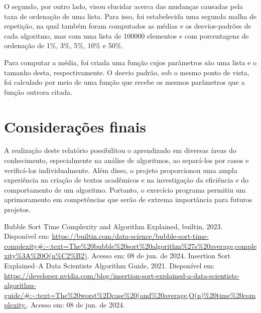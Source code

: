 \documentclass[10pt,a4paper]{article}
\begin{document}
    O segundo, por outro lado, visou elucidar acerca das mudanças causadas pela taxa de ordenação de uma lista.
    Para isso, foi estabelecida uma segunda malha de repetição, na qual também foram computados as médias e os desvios-padrões de cada algoritmo, mas com uma lista de 100000 elementos e com porcentagens de ordenação de 1\%, 3\%, 5\%, 10\% e 50\%.
    

    Para computar a média, foi criada uma função cujos parâmetros são uma lista e o tamanho desta, respectivamente. O desvio padrão, sob o mesmo ponto de vista, foi calculado por meio de uma função que recebe os mesmos parâmetros que a função outrora citada.
    


\newpage
\tableofcontents










\section{Considerações finais}
A realização deste relatório possibilitou o aprendizado em diversas áreas do conhecimento, especialmente na análise de algoritmos, ao separá-los por casos e verificá-los individualmente.
Além disso, o projeto proporcionou uma ampla experiência na criação de textos acadêmicos e na investigação da eficiência e do comportamento de um algoritmo.
Portanto, o exercício programa permitiu um aprimoramento em competências que serão de extrema importância para futuros projetos.

\newpage
\begin{thebibliography}{3}
    Bubble Sort Time Complexity and Algorithm Explained, builtin, 2023. Disponível em: \url{https://builtin.com/data-science/bubble-sort-time-complexity#:~:text=The%20bubble%20sort%20algorithm%27s%20average,complexity%3A%20O(n%C2%B2)}. Acesso em: 08 de jun. de 2024.
    Insertion Sort Explained–A Data Scientists Algorithm Guide, 2021. Disponível em: \url{https://developer.nvidia.com/blog/insertion-sort-explained-a-data-scientists-algorithm-guide/#:~:text=The%20worst%2Dcase%20(and%20average,O(n)%20time%20complexity.}. Acesso em: 08 de jun. de 2024.
\end{thebibliography}
\end{document}
